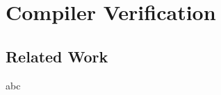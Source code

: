\chapter{\;\;\;\;Compiler Verification}
\label{sec:compiler}










\section{Related Work}
\label{sec:compiler:related}
abc

